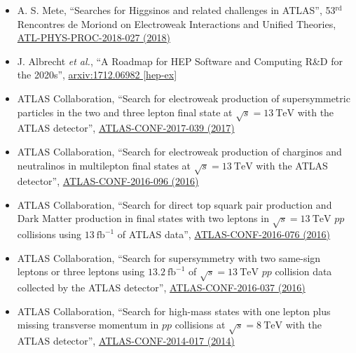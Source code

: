 \documentclass[a4paper,10pt]{article}
\begin{document}
\begin{itemize}
	\item A. S. Mete,
	``Searches for Higgsinos and related challenges in ATLAS'',
	53$^{\mathrm{rd}}$ Rencontres de Moriond on Electroweak Interactions and Unified Theories,
	\href{https://cds.cern.ch/record/1478973}{ATL-PHYS-PROC-2018-027 (2018)}
	\item J. Albrecht {\it et al.}, 
	``A Roadmap for HEP Software and Computing R\&D for the 2020s'',
	\href{https://arxiv.org/abs/1712.06982}{arxiv:1712.06982 [hep-ex]}
	\item ATLAS Collaboration,
	``Search for electroweak production of supersymmetric particles in the two and three lepton final state at $\sqrt{s}=13\ \mathrm{TeV}$ with the ATLAS detector'',
	\href{https://atlas.web.cern.ch/Atlas/GROUPS/PHYSICS/CONFNOTES/ATLAS-CONF-2017-039/}{ATLAS-CONF-2017-039 (2017)}
	\item ATLAS Collaboration,
	``Search for electroweak production of charginos and neutralinos in multilepton final states at $\sqrt{s}=13\ \mathrm{TeV}$ with the ATLAS detector'',
	\href{https://atlas.web.cern.ch/Atlas/GROUPS/PHYSICS/CONFNOTES/ATLAS-CONF-2016-096/}{ATLAS-CONF-2016-096 (2016)}
	\item ATLAS Collaboration, 
	``Search for direct top squark pair production and Dark Matter production in final states with two leptons in $\sqrt{s}=13\ \mathrm{TeV}$ $pp$ collisions using $13\ \mathrm{fb}^{-1}$ of ATLAS data'',
	\href{https://atlas.web.cern.ch/Atlas/GROUPS/PHYSICS/CONFNOTES/ATLAS-CONF-2016-076/}{ATLAS-CONF-2016-076 (2016)}
	\item ATLAS Collaboration,
	``Search for supersymmetry with two same-sign leptons or three leptons using $13.2\ \mathrm{fb}^{-1}$ of $\sqrt{s}=13\ \mathrm{TeV}$ $pp$ collision data collected by the ATLAS detector'',
	\href{https://atlas.web.cern.ch/Atlas/GROUPS/PHYSICS/CONFNOTES/ATLAS-CONF-2016-037/}{ATLAS-CONF-2016-037 (2016)} 
	\item ATLAS Collaboration, 
	``Search for high-mass states with one lepton plus missing transverse momentum in $pp$ collisions at $\sqrt{s}= 8\ \mathrm{TeV}$ with the ATLAS detector'',
	\href{https://atlas.web.cern.ch/Atlas/GROUPS/PHYSICS/CONFNOTES/ATLAS-CONF-2014-017/}{ATLAS-CONF-2014-017 (2014)} 

\end{itemize}
\end{document}
